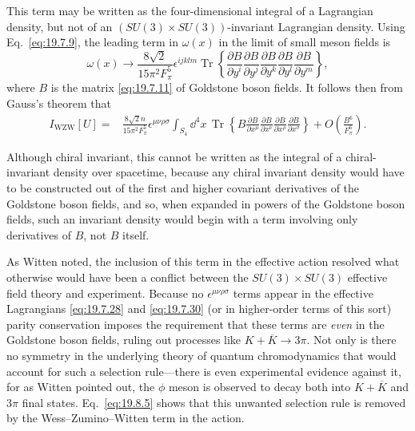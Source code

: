 This term may be written as the four-dimensional integral of a Lagrangian density, but not of an $(SU(3)\times SU(3))$-invariant Lagrangian density. Using Eq.~\eqref{eq:19.7.9}, the leading term in $\omega(x)$ in the limit of small meson fields is
\begin{equation}
\omega(x)\longrightarrow
\frac{8\sqrt{2}}{15\pi^2F_\pi^5}\epsilon^{ijklm}
\operatorname{Tr}\left\{
\frac{\partial B}{\partial y^i}
\frac{\partial B}{\partial y^j}
\frac{\partial B}{\partial y^k}
\frac{\partial B}{\partial y^l}
\frac{\partial B}{\partial y^m}
\right\},
\tag{19.8.4}\label{eq:19.8.4}
\end{equation}
where $B$ is the matrix \eqref{eq:19.7.11} of Goldstone boson fields. It follows then from Gauss's theorem that
\begin{align}
I_{\mathrm{WZW}}[U]
={}&\frac{8\sqrt{2}n}{15\pi^2F_\pi^5}\epsilon^{\mu\nu\rho\sigma}
\int_{S_4}\dd^4x\,
\operatorname{Tr}\left\{
B\frac{\partial B}{\partial x^\mu}
\frac{\partial B}{\partial x^\nu}
\frac{\partial B}{\partial x^\rho}
\frac{\partial B}{\partial x^\sigma}
\right\}
+O\left(\frac{B^6}{F_\pi^6}\right).
\tag{19.8.5}\label{eq:19.8.5}
\end{align}

Although chiral invariant, this cannot be written as the integral of a chiral-invariant density over spacetime, because any chiral invariant density would have to be constructed out of the first and higher covariant derivatives of the Goldstone boson fields, and so, when expanded in powers of the Goldstone boson fields, such an invariant density would begin with a term involving only derivatives of $B$, not $B$ itself.

As Witten noted, the inclusion of this term in the effective action resolved what otherwise would have been a conflict between the $SU(3)\times SU(3)$ effective field theory and experiment. Because no $\epsilon^{\mu\nu\rho\sigma}$ terms appear in the effective Lagrangians \eqref{eq:19.7.28} and \eqref{eq:19.7.30} (or in higher-order terms of this sort) parity conservation imposes the requirement that these terms are \emph{even} in the Goldstone boson fields, ruling out processes like $K+\overline K\to3\pi$. Not only is there no symmetry in the underlying theory of quantum chromodynamics that would account for such a selection rule---there is even experimental evidence against it, for as Witten pointed out, the $\phi$ meson is observed to decay both into $K+\overline K$ and $3\pi$ final states. Eq.~\eqref{eq:19.8.5} shows that this unwanted selection rule is removed by the Wess--Zumino--Witten term in the action.

